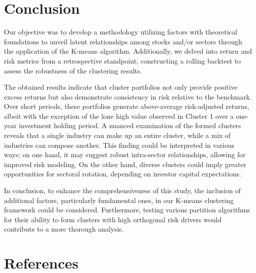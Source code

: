 \documentclass[11pt,preprint, authoryear]{elsarticle}
\numberwithin{equation}{section}
\numberwithin{figure}{section}
\numberwithin{table}{section}
\begin{document}
\hypertarget{conclusion}{%
\section{\texorpdfstring{Conclusion
\label{con}}{Conclusion }}\label{conclusion}}

Our objective was to develop a methodology utilizing factors with
theoretical foundations to unveil latent relationships among stocks
and/or sectors through the application of the K-means algorithm.
Additionally, we delved into return and risk metrics from a
retrospective standpoint, constructing a rolling backtest to assess the
robustness of the clustering results.

The obtained results indicate that cluster portfolios not only provide
positive excess returns but also demonstrate consistency in risk
relative to the benchmark. Over short periods, these portfolios generate
above-average risk-adjusted returns, albeit with the exception of the
lone high value observed in Cluster 1 over a one-year investment holding
period. A nuanced examination of the formed clusters reveals that a
single industry can make up an entire cluster, while a mix of industries
can compose another. This finding could be interpreted in various ways;
on one hand, it may suggest robust intra-sector relationships, allowing
for improved risk modeling. On the other hand, diverse clusters could
imply greater opportunities for sectoral rotation, depending on investor
capital expectations.

In conclusion, to enhance the comprehensiveness of this study, the
inclusion of additional factors, particularly fundamental ones, in our
K-means clustering framework could be considered. Furthermore, testing
various partition algorithms for their ability to form clusters with
high orthogonal risk drivers would contribute to a more thorough
analysis.

\newpage

\hypertarget{references}{%
\section{References}\label{references}}
\end{document}
